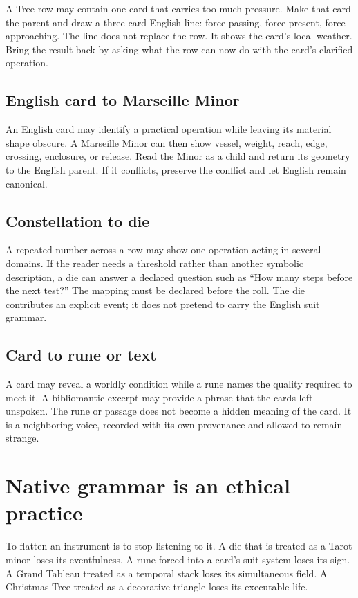 A Tree row may contain one card that carries too much pressure. Make that card
the parent and draw a three-card English line: force passing, force present,
force approaching. The line does not replace the row. It shows the card's local
weather. Bring the result back by asking what the row can now do with the
card's clarified operation.

\subsection{English card to Marseille Minor}

An English card may identify a practical operation while leaving its material
shape obscure. A Marseille Minor can then show vessel, weight, reach, edge,
crossing, enclosure, or release. Read the Minor as a child and return its
geometry to the English parent. If it conflicts, preserve the conflict and let
English remain canonical.

\subsection{Constellation to die}

A repeated number across a row may show one operation acting in several domains.
If the reader needs a threshold rather than another symbolic description, a die
can answer a declared question such as ``How many steps before the next test?''
The mapping must be declared before the roll. The die contributes an explicit
event; it does not pretend to carry the English suit grammar.

\subsection{Card to rune or text}

A card may reveal a worldly condition while a rune names the quality required to
meet it. A bibliomantic excerpt may provide a phrase that the cards left
unspoken. The rune or passage does not become a hidden meaning of the card. It
is a neighboring voice, recorded with its own provenance and allowed to remain
strange.

\section{Native grammar is an ethical practice}

To flatten an instrument is to stop listening to it. A die that is treated as a
Tarot minor loses its eventfulness. A rune forced into a card's suit system loses
its sign. A Grand Tableau treated as a temporal stack loses its simultaneous
field. A Christmas Tree treated as a decorative triangle loses its executable
life.

